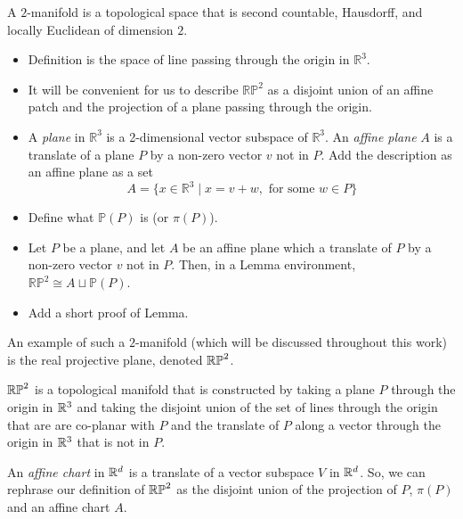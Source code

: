 \documentclass{amsart}
\begin{document}
A $2$-manifold is a topological space that is second countable, Hausdorff, and locally Euclidean of dimension $2$.
\begin{itemize}
	\item Definition is the space of line passing through the origin in $\mathbb R^3$.
	\item It will be convenient for us to describe $\mathbb {RP}^2$ as a disjoint union of an affine patch and the projection of a plane passing through the origin.
	\item A {\em plane} in $\mathbb R^3$ is a 2-dimensional vector subspace of $\mathbb R^3$. An {\em affine plane} $A$ is a translate of a plane $P$ by a non-zero vector $v$ not in $P$. Add the description as an affine plane as a set
	\[
	A=\{x\in\mathbb R^3\mid x=v+w, \text{ for some }w\in P\}
	\]
	\item Define what $\mathbb P(P)$ is (or $\pi(P)$).
	\item Let $P$ be a plane, and let $A$ be an affine plane which a translate of $P$ by a non-zero vector $v$ not in $P$. Then, in a Lemma environment, $\mathbb {RP}^2\cong A\sqcup \mathbb{P}(P)$.
	\item Add a short proof of Lemma.
\end{itemize}
An example of such a $2$-manifold (which will be discussed throughout this work) is the real projective plane, denoted $\mathbb{RP}^2$.

$\mathbb{RP}^2$ is a topological manifold that is constructed by taking a plane $P$ through the origin in $\mathbb{R}^3$ and taking the disjoint union of the set of lines through the origin that are are co-planar with $P$ and the translate of $P$ along a vector through the origin in $\mathbb{R}^3$ that is not in $P$. 

An \emph{affine chart} in $\mathbb{R}^d$ is a translate of a vector subspace $V$ in $\mathbb{R}^d$. So, we can rephrase our definition of $\mathbb{RP}^2$ as the disjoint union of the projection of $P$, $\pi(P)$ and an affine chart $A$.
\end{document}
